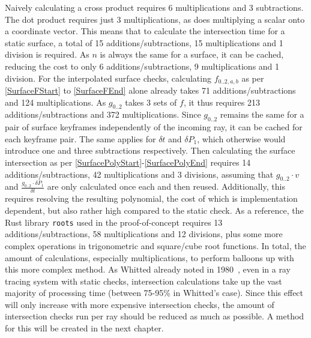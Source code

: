 Naively calculating a cross product requires 6 multiplications and 3 subtractions.
The dot product requires just 3 multiplications, as does multiplying a scalar onto a coordinate vector.
This means that to calculate the intersection time for a static surface,
a total of 15 additions/subtractions, 15 multiplications and 1 division is required.
As \(n\) is always the same for a surface, it can be cached,
reducing the cost to only 6 additions/subtractions, 9 multiplications and 1 division.
\newline
For the interpolated surface checks, calculating \(f_{0..2, a, b}\) as per \eqref{SurfaceFStart} to \eqref{SurfaceFEnd}
alone already takes 71 additions/subtractions and 124 multiplications.
As \(g_{0..2}\) takes 3 sets of \(f\), it thus requires 213 additions/subtractions and 372 multiplications.
Since \(g_{0..2}\) remains the same for a pair of surface keyframes independently of the incoming ray,
it can be cached for each keyframe pair. The same applies for \(\delta t\) and \(\delta P_1\),
which otherwise would introduce one and three subtractions respectively.
\newline
Then calculating the surface intersection as per \eqref{SurfacePolyStart}-\eqref{SurfacePolyEnd}
requires 14 additions/subtractions, 42 multiplications and 3 divisions,
assuming that \(g_{0..2} \cdot v\) and \(\frac{g_{0..2} \cdot \delta P_1}{\delta t}\)
are only calculated once each and then reused.
\newline
Additionally, this requires resolving the resulting polynomial,
the cost of which is implementation dependent, but also rather high compared to the static check.
As a reference, the Rust library \verb|roots| used in the proof-of-concept requires 13 additions/subtractions,
58 multiplications and 12 divisions, plus some more complex operations in trigonometric and square/cube root functions.
\newline
In total, the amount of calculations, especially multiplications, to perform balloons up with this more complex method.
As Whitted already noted in 1980~\cite{Wh80}, even in a ray tracing system with static checks,
intersection calculations take up the vast majority of processing time (between 75-95\% in Whitted's case).
Since this effect will only increase with more expensive intersection checks,
the amount of intersection checks run per ray should be reduced as much as possible.
A method for this will be created in the next chapter.
